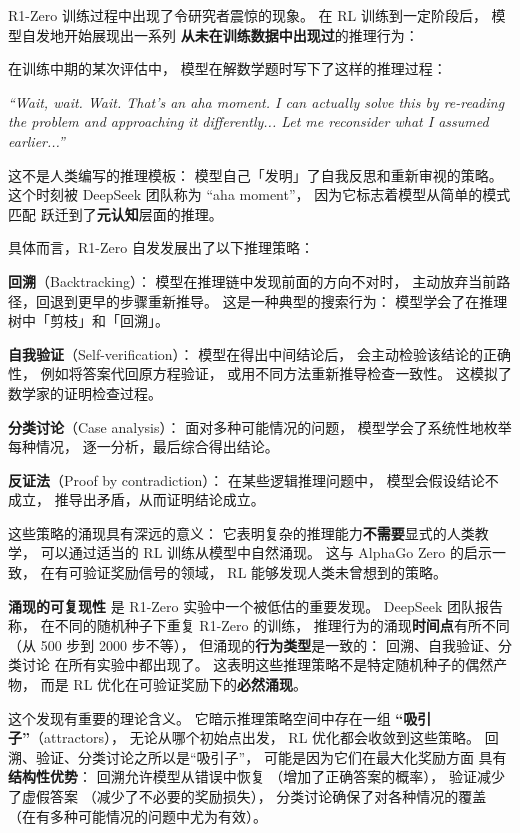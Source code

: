 R1-Zero 训练过程中出现了令研究者震惊的现象。
在 RL 训练到一定阶段后，
模型自发地开始展现出一系列
\textbf{从未在训练数据中出现过}的推理行为：

\begin{corebox}
在训练中期的某次评估中，
模型在解数学题时写下了这样的推理过程：

\textit{“Wait, wait. Wait. That's an aha moment.
I can actually solve this by re-reading the problem
and approaching it differently...
Let me reconsider what I assumed earlier...”}

这不是人类编写的推理模板：
模型自己「发明」了自我反思和重新审视的策略。
这个时刻被 DeepSeek 团队称为 “aha moment”，
因为它标志着模型从简单的模式匹配
跃迁到了\textbf{元认知}层面的推理。
\end{corebox}

具体而言，R1-Zero 自发发展出了以下推理策略：

\textbf{回溯}（Backtracking）：
模型在推理链中发现前面的方向不对时，
主动放弃当前路径，回退到更早的步骤重新推导。
这是一种典型的搜索行为：
模型学会了在推理树中「剪枝」和「回溯」。

\textbf{自我验证}（Self-verification）：
模型在得出中间结论后，
会主动检验该结论的正确性，
例如将答案代回原方程验证，
或用不同方法重新推导检查一致性。
这模拟了数学家的证明检查过程。

\textbf{分类讨论}（Case analysis）：
面对多种可能情况的问题，
模型学会了系统性地枚举每种情况，
逐一分析，最后综合得出结论。

\textbf{反证法}（Proof by contradiction）：
在某些逻辑推理问题中，
模型会假设结论不成立，
推导出矛盾，从而证明结论成立。

这些策略的涌现具有深远的意义：
它表明复杂的推理能力\textbf{不需要}显式的人类教学，
可以通过适当的 RL 训练从模型中自然涌现。
这与 AlphaGo Zero 的启示一致，
在有可验证奖励信号的领域，
RL 能够发现人类未曾想到的策略。

\textbf{涌现的可复现性}
是 R1-Zero 实验中一个被低估的重要发现。
DeepSeek 团队报告称，
在不同的随机种子下重复 R1-Zero 的训练，
推理行为的涌现\textbf{时间点}有所不同
（从 500 步到 2000 步不等），
但涌现的\textbf{行为类型}是一致的：
回溯、自我验证、分类讨论
在所有实验中都出现了。
这表明这些推理策略不是特定随机种子的偶然产物，
而是 RL 优化在可验证奖励下的\textbf{必然涌现}。

这个发现有重要的理论含义。
它暗示推理策略空间中存在一组
\textbf{“吸引子”}（attractors），
无论从哪个初始点出发，
RL 优化都会收敛到这些策略。
回溯、验证、分类讨论之所以是“吸引子”，
可能是因为它们在最大化奖励方面
具有\textbf{结构性优势}：
回溯允许模型从错误中恢复
（增加了正确答案的概率），
验证减少了虚假答案
（减少了不必要的奖励损失），
分类讨论确保了对各种情况的覆盖
（在有多种可能情况的问题中尤为有效）。


